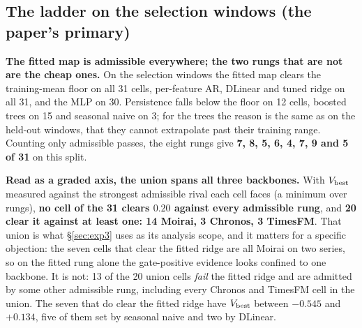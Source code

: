\subsection{The ladder on the selection windows (the paper's primary)}
\label{app:baselines:val}

\begin{table}[!htbp]
\centering
\caption{\textbf{Gate $\Vb{b}$ under eight denominators and a floor, on the
\emph{selection} windows.}  Same conventions as
Table~\ref{tab:baselinefamily}; this is the split every admission decision in the
body is made on, and the numerator comes from
\texttt{results/gate\_val\_side.json}.  Generated by
\texttt{scripts/gate\_baseline\_sensitivity.py --split val}.}
\label{tab:baselinefamilyval}

\end{table}

\textbf{The fitted map is admissible everywhere; the two rungs that are not are
the cheap ones.}  On the selection windows the fitted map clears the training-mean
floor on all 31 cells, per-feature AR, DLinear and tuned ridge on all 31, and the
MLP on 30.  Persistence falls below the floor on 12 cells, boosted trees on 15 and
seasonal naive on 3; for the trees the reason is the same as on the held-out
windows, that they cannot extrapolate past their training range.  Counting only
admissible passes, the eight rungs give
\textbf{7, 8, 5, 6, 4, 7, 9 and 5 of 31} on this split.

\textbf{Read as a graded axis, the union spans all three backbones.}  With
$V_{\text{best}}$ measured against the strongest admissible rival each cell
faces (a minimum over rungs), \textbf{no cell of the 31 clears $0.20$ against
every admissible rung}, and \textbf{20 clear it against at least one: 14 Moirai, 3
Chronos, 3 TimesFM}.  That union is what \S\ref{sec:exp3} uses as its analysis
scope, and it matters for a specific objection: the seven cells that clear the
fitted ridge are all Moirai on two series, so on the fitted rung alone the
gate-positive evidence looks confined to one backbone.  It is not: 13 of the 20
union cells \emph{fail} the fitted ridge and are admitted by some other admissible
rung, including every Chronos and TimesFM cell in the union.  The seven that do
clear the fitted ridge have $V_{\text{best}}$ between $-0.545$ and
$+0.134$, five of them set by seasonal naive and two by DLinear.

